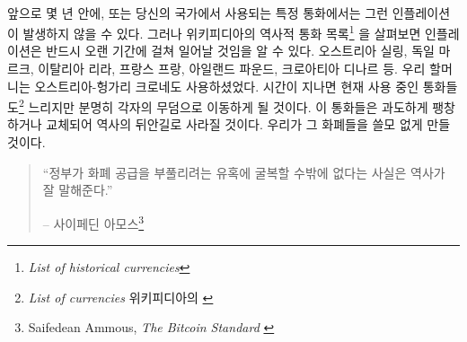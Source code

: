 \paragraph{}
앞으로 몇 년 안에, 또는 당신의 국가에서 사용되는 특정 통화에서는 그런 인플레이션이 발생하지 않을 수 있다. 
그러나 위키피디아의 역사적 통화 목록\footnote{\textit{List of historical currencies}\cite{wiki:historical-currencies}}
을 살펴보면 인플레이션은 반드시 오랜 기간에 걸쳐 일어날 것임을 알 수 있다.
오스트리아 실링, 독일 마르크, 이탈리아 리라, 프랑스 프랑, 아일랜드 파운드, 크로아티아 디나르 등.
우리 할머니는 오스트리아-헝가리 크로네도 사용하셨었다. 
시간이 지나면 현재 사용 중인 통화들도\footnote{\textit{List of currencies} 위키피디아의 \cite{wiki:list-of-currencies}}
느리지만 분명히 각자의 무덤으로 이동하게 될 것이다.
이 통화들은 과도하게 팽창하거나 교체되어 역사의 뒤안길로 사라질 것이다.
우리가 그 화폐들을 쓸모 없게 만들 것이다.

\begin{quotation}\begin{samepage}
		\enquote{정부가 화폐 공급을 부풀리려는 유혹에 굴복할 수밖에 없다는 사실은 역사가 잘 말해준다.}
		\begin{flushright} -- 사이페딘 아모스\footnote{Saifedean Ammous, \textit{The Bitcoin
					Standard} \cite{bitcoin-standard}}
\end{flushright}\end{samepage}\end{quotation}

